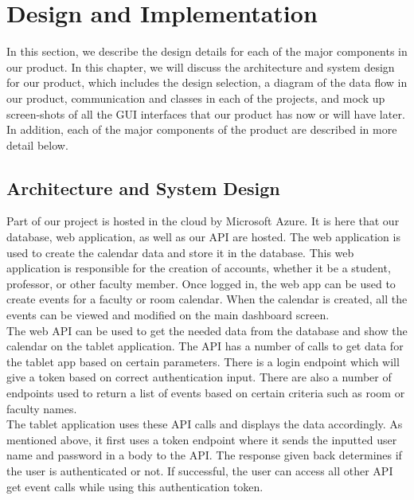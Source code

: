 
\chapter{Design  and Implementation}
In this section, we describe the design details for each of the major components in our product. In this chapter, we will discuss the architecture and system design for our product, which includes the design selection, a diagram of the data flow in our product, communication and classes in each of the projects, and mock up screen-shots of all the GUI interfaces that our product has now or will have later. In addition, each of the major components of the product are described in more detail below.
 

\section{Architecture and System Design}
Part of our project is hosted in the cloud by Microsoft Azure. It is here that our database, web application, as well as our API are hosted. The web application is used to create the calendar data and store it in the database. This web application is responsible for the creation of accounts, whether it be a student, professor, or other faculty member.  Once logged in, the web app can be used to create events for a faculty or room calendar.  When the calendar is created, all the events can be viewed and modified on the main dashboard screen.\\


The web API can be used to get the needed data from the database and show the calendar on the tablet application.  The API has a number of calls to get data for the tablet app based on certain parameters.  There is a login endpoint which will give a token based on correct authentication input.  There are also a number of endpoints used to return a list of events based on certain criteria such as room or faculty names.\\

The tablet application uses these API calls and displays the data accordingly.  As mentioned above, it first uses a token endpoint where it sends the inputted user name and password in a body to the API.  The response given back determines if the user is authenticated or not.  If successful, the user can access all other API get event calls while using this authentication token.

  

